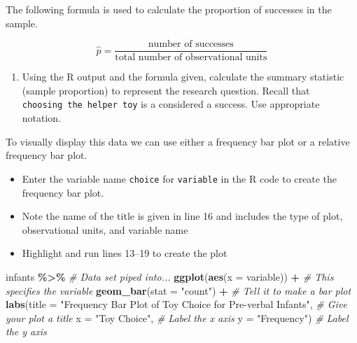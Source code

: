 \documentclass[
]{report}
\newenvironment{Shaded}{\begin{snugshade}}{\end{snugshade}}
\newcommand{\AttributeTok}[1]{\textcolor[rgb]{0.13,0.29,0.53}{#1}}
\newcommand{\CommentTok}[1]{\textcolor[rgb]{0.56,0.35,0.01}{\textit{#1}}}
\newcommand{\FunctionTok}[1]{\textcolor[rgb]{0.13,0.29,0.53}{\textbf{#1}}}
\newcommand{\NormalTok}[1]{#1}
\newcommand{\SpecialCharTok}[1]{\textcolor[rgb]{0.81,0.36,0.00}{\textbf{#1}}}
\newcommand{\StringTok}[1]{\textcolor[rgb]{0.31,0.60,0.02}{#1}}
\providecommand{\tightlist}{%
  \setlength{\itemsep}{0pt}\setlength{\parskip}{0pt}}
\begin{document}
The following formula is used to calculate the proportion of successes in the sample.

\[\hat{p} = \frac{\mbox{number of successes}}{\mbox{total number of observational units}}\]

\begin{enumerate}
\def\labelenumi{\arabic{enumi}.}
\setcounter{enumi}{2}
\tightlist
\item
  Using the R output and the formula given, calculate the summary statistic (sample proportion) to represent the research question. Recall that \texttt{choosing\ the\ helper\ toy} is a considered a success. Use appropriate notation.
\end{enumerate}

\vspace{0.5in}

To visually display this data we can use either a frequency bar plot or a relative frequency bar plot.

\begin{itemize}
\item
  Enter the variable name \texttt{choice} for \texttt{variable} in the R code to create the frequency bar plot.
\item
  Note the name of the title is given in line 16 and includes the type of plot, observational units, and variable name
\item
  Highlight and run lines 13--19 to create the plot
\end{itemize}

\begin{Shaded}
\begin{Highlighting}[]
\NormalTok{infants }\SpecialCharTok{\%\textgreater{}\%} \CommentTok{\# Data set piped into...}
    \FunctionTok{ggplot}\NormalTok{(}\FunctionTok{aes}\NormalTok{(}\AttributeTok{x =}\NormalTok{ variable)) }\SpecialCharTok{+}   \CommentTok{\# This specifies the variable}
    \FunctionTok{geom\_bar}\NormalTok{(}\AttributeTok{stat =} \StringTok{"count"}\NormalTok{) }\SpecialCharTok{+}  \CommentTok{\# Tell it to make a bar plot}
    \FunctionTok{labs}\NormalTok{(}\AttributeTok{title =} \StringTok{"Frequency Bar Plot of Toy Choice for Pre{-}verbal Infants"}\NormalTok{,  }
       \CommentTok{\# Give your plot a title}
       \AttributeTok{x =} \StringTok{"Toy Choice"}\NormalTok{,   }\CommentTok{\# Label the x axis}
       \AttributeTok{y =} \StringTok{"Frequency"}\NormalTok{)  }\CommentTok{\# Label the y axis}
\end{Highlighting}
\end{Shaded}
\end{document}
